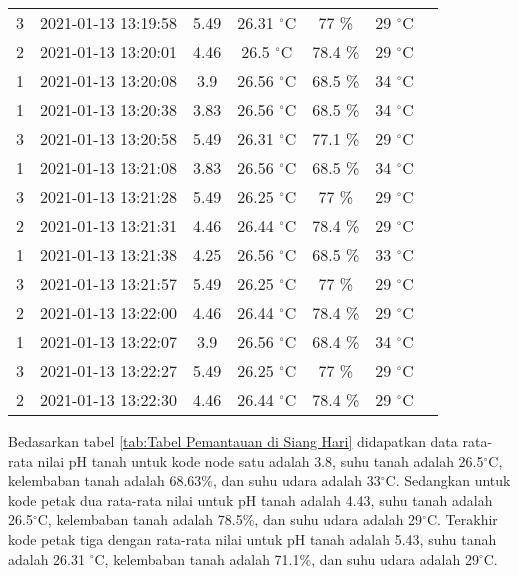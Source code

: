 \begin{itemize}
\begin{table}[H]
\begin{tabular}{ccccccc}
                     3 & 2021-01-13 13:19:58 &  5.49 & 26.31 $^{\circ}$C & 77 \%& 29 $^{\circ}$C  \\  
                     2 & 2021-01-13 13:20:01 &  4.46 & 26.5 $^{\circ}$C & 78.4 \%& 29 $^{\circ}$C \\  
                  1 & 2021-01-13 13:20:08   &  3.9 & 26.56 $^{\circ}$C & 68.5 \%& 34 $^{\circ}$C   \\  
                     1 & 2021-01-13 13:20:38 &  3.83 & 26.56 $^{\circ}$C & 68.5 \%& 34 $^{\circ}$C \\  
                    3 & 2021-01-13 13:20:58   &  5.49 & 26.31 $^{\circ}$C & 77.1 \%& 29 $^{\circ}$C\\
                     1 & 2021-01-13 13:21:08  &  3.83 & 26.56 $^{\circ}$C & 68.5 \%& 34 $^{\circ}$C\\  
                     3 & 2021-01-13 13:21:28 &  5.49 & 26.25 $^{\circ}$C & 77 \%& 29 $^{\circ}$C  \\  
                     2 & 2021-01-13 13:21:31 &  4.46 & 26.44 $^{\circ}$C & 78.4 \%& 29 $^{\circ}$C  \\  
                     1 & 2021-01-13 13:21:38 &  4.25 & 26.56 $^{\circ}$C & 68.5 \%& 33 $^{\circ}$C \\  
                     3 & 2021-01-13 13:21:57 &  5.49 & 26.25 $^{\circ}$C & 77 \%& 29 $^{\circ}$C \\  
                    2 & 2021-01-13 13:22:00  &  4.46 & 26.44 $^{\circ}$C & 78.4 \%& 29 $^{\circ}$C\\  
                    1 & 2021-01-13 13:22:07 &  3.9 & 26.56 $^{\circ}$C & 68.4 \%& 34 $^{\circ}$C  \\  
                     3 & 2021-01-13 13:22:27 &  5.49 & 26.25 $^{\circ}$C & 77 \%& 29 $^{\circ}$C \\  
                     2 & 2021-01-13 13:22:30  &  4.46 & 26.44 $^{\circ}$C& 78.4 \%& 29 $^{\circ}$C \\  
                
            		\bottomrule
            	\end{tabular} 
            \end{table}
            
            Bedasarkan tabel \ref{tab:Tabel Pemantauan di Siang Hari} didapatkan data rata-rata nilai pH tanah untuk kode node satu adalah 3.8, suhu tanah adalah 26.5$^{\circ}$C, kelembaban tanah adalah 68.63\%, dan suhu udara adalah 33$^{\circ}$C. Sedangkan untuk kode petak dua rata-rata nilai untuk pH tanah adalah 4.43, suhu tanah adalah 26.5$^{\circ}$C, kelembaban tanah adalah 78.5\%, dan suhu udara adalah 29$^{\circ}$C. Terakhir kode petak tiga dengan rata-rata nilai untuk pH tanah adalah 5.43, suhu tanah adalah 26.31 $^{\circ}$C, kelembaban tanah adalah 71.1\%, dan suhu udara adalah 29$^{\circ}$C.
            

\end{itemize}
